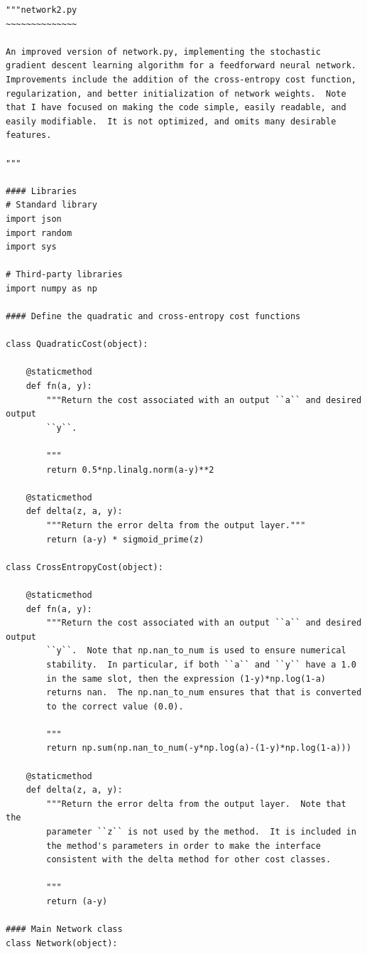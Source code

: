 \begin{lstlisting}
"""network2.py
~~~~~~~~~~~~~~

An improved version of network.py, implementing the stochastic
gradient descent learning algorithm for a feedforward neural network.
Improvements include the addition of the cross-entropy cost function,
regularization, and better initialization of network weights.  Note
that I have focused on making the code simple, easily readable, and
easily modifiable.  It is not optimized, and omits many desirable
features.

"""

#### Libraries
# Standard library
import json
import random
import sys

# Third-party libraries
import numpy as np

#### Define the quadratic and cross-entropy cost functions

class QuadraticCost(object):

    @staticmethod
    def fn(a, y):
        """Return the cost associated with an output ``a`` and desired output
        ``y``.

        """
        return 0.5*np.linalg.norm(a-y)**2

    @staticmethod
    def delta(z, a, y):
        """Return the error delta from the output layer."""
        return (a-y) * sigmoid_prime(z)

class CrossEntropyCost(object):

    @staticmethod
    def fn(a, y):
        """Return the cost associated with an output ``a`` and desired output
        ``y``.  Note that np.nan_to_num is used to ensure numerical
        stability.  In particular, if both ``a`` and ``y`` have a 1.0
        in the same slot, then the expression (1-y)*np.log(1-a)
        returns nan.  The np.nan_to_num ensures that that is converted
        to the correct value (0.0).

        """
        return np.sum(np.nan_to_num(-y*np.log(a)-(1-y)*np.log(1-a)))

    @staticmethod
    def delta(z, a, y):
        """Return the error delta from the output layer.  Note that the
        parameter ``z`` is not used by the method.  It is included in
        the method's parameters in order to make the interface
        consistent with the delta method for other cost classes.

        """
        return (a-y)

#### Main Network class
class Network(object):


\end{lstlisting}
